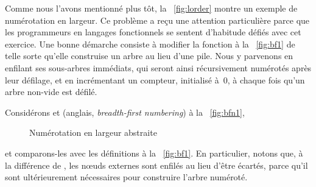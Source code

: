 Comme nous l'avons mentionné plus tôt, la \fig~\vref{fig:lorder}
montre un exemple de numérotation en largeur. Ce problème a reçu une
attention particulière
\citep{JonesGibbons_1993,GibbonsJones_1998,Okasaki_2000} parce que les
programmeurs en langages fonctionnels se sentent d'habitude défiés
avec cet exercice. Une bonne démarche consiste à modifier la fonction
 à la \fig~\vref{fig:bf1}
de telle sorte qu'elle construise un arbre au lieu d'une pile. Nous y
parvenons en enfilant ses sous-arbres immédiats, qui seront ainsi
récursivement numérotés après leur défilage, et en incrémentant un
compteur, initialisé à~\(0\), à chaque fois qu'un arbre non-vide est
défilé.

Considérons  et
 (anglais,
\emph{breadth-first numbering}) à la \fig~\vref{fig:bfn1},
\begin{figure}
\abovedisplayskip=0pt
\belowdisplayskip=0pt
\centering
{}
\caption{Numérotation en largeur abstraite\label{fig:bfn1}}
\end{figure}
et comparons-les avec les définitions à la \fig~\vref{fig:bf1}. En
particulier, notons que, à la différence de
, les n{\oe}uds externes
sont enfilés au lieu d'être écartés, parce qu'il sont ultérieurement
nécessaires pour construire l'arbre numéroté.

